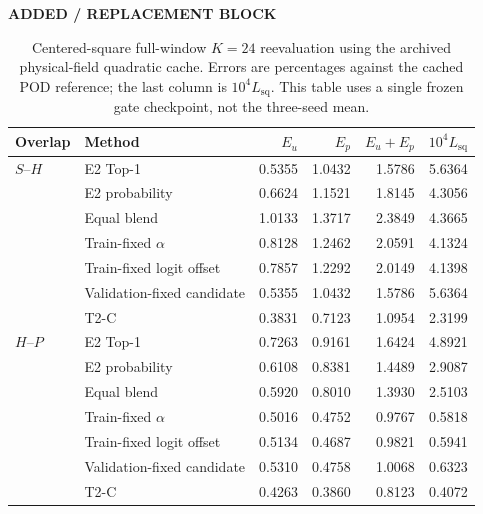 \documentclass{article}
\begin{document}
{\color{blue}
\begin{table}[H]
\color{blue}\noindent\textbf{ADDED / REPLACEMENT BLOCK}\par
\centering
\caption{Centered-square full-window $K=24$ reevaluation using the
archived physical-field quadratic cache. Errors are percentages against
the cached POD reference; the last column is $10^4 L_{\mathrm{sq}}$.
This table uses a single frozen gate checkpoint, not the three-seed mean.}
\label{tab:t2c_full_window_controls}
\small
\setlength{\tabcolsep}{3.5pt}
\begin{tabular}{@{}llrrrr@{}}
\toprule
Overlap & Method & $E_u$ & $E_p$ & $E_u+E_p$ & $10^4L_{\mathrm{sq}}$\\
\midrule
$S$--$H$ & E2 Top-1 & 0.5355 & 1.0432 & 1.5786 & 5.6364 \\
 & E2 probability & 0.6624 & 1.1521 & 1.8145 & 4.3056 \\
 & Equal blend & 1.0133 & 1.3717 & 2.3849 & 4.3665 \\
 & Train-fixed $\alpha$ & 0.8128 & 1.2462 & 2.0591 & 4.1324 \\
 & Train-fixed logit offset & 0.7857 & 1.2292 & 2.0149 & 4.1398 \\
 & Validation-fixed candidate & 0.5355 & 1.0432 & 1.5786 & 5.6364 \\
 & T2-C & 0.3831 & 0.7123 & 1.0954 & 2.3199 \\
\midrule
$H$--$P$ & E2 Top-1 & 0.7263 & 0.9161 & 1.6424 & 4.8921 \\
 & E2 probability & 0.6108 & 0.8381 & 1.4489 & 2.9087 \\
 & Equal blend & 0.5920 & 0.8010 & 1.3930 & 2.5103 \\
 & Train-fixed $\alpha$ & 0.5016 & 0.4752 & 0.9767 & 0.5818 \\
 & Train-fixed logit offset & 0.5134 & 0.4687 & 0.9821 & 0.5941 \\
 & Validation-fixed candidate & 0.5310 & 0.4758 & 1.0068 & 0.6323 \\
 & T2-C & 0.4263 & 0.3860 & 0.8123 & 0.4072 \\
\bottomrule
\end{tabular}
\end{table}
}
\end{document}
